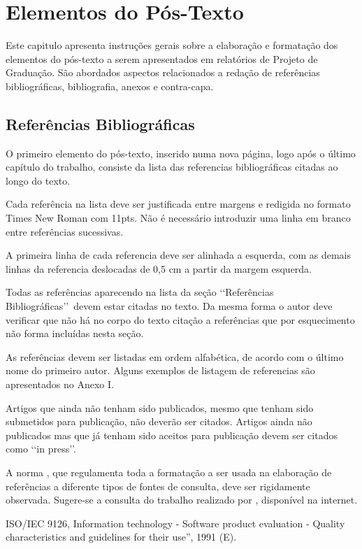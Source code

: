 \chapter[Elementos do Pós-Texto]{Elementos do Pós-Texto}

Este capitulo apresenta instruções gerais sobre a elaboração e formatação dos 
elementos do pós-texto a serem apresentados em relatórios de Projeto de 
Graduação. São abordados aspectos relacionados a redação de referências 
bibliográficas, bibliografia, anexos e contra-capa.

\section{Referências Bibliográficas}

O primeiro elemento do pós-texto, inserido numa nova página, logo após o último 
capítulo do trabalho, consiste da lista das referencias bibliográficas citadas 
ao longo do texto.

Cada referência na lista deve ser justificada entre margens e redigida no 
formato Times New Roman com 11pts. Não é necessário introduzir uma linha em 
branco entre referências sucessivas.

A primeira linha de cada referencia deve ser alinhada a esquerda, com as demais 
linhas da referencia deslocadas de 0,5 cm a partir da margem esquerda. 

Todas as referências aparecendo na lista da seção \lq\lq Referências 
Bibliográficas\rq\rq\ devem estar citadas no texto. Da mesma forma o autor deve 
verificar que não há no corpo do texto citação a referências que por 
esquecimento não forma incluídas nesta seção.

As referências devem ser listadas em ordem alfabética, de acordo com o último 
nome do primeiro autor. Alguns exemplos de listagem de referencias são 
apresentados no Anexo I.

Artigos que ainda não tenham sido publicados, mesmo que tenham sido submetidos 
para publicação, não deverão ser citados. Artigos ainda não publicados mas que 
já tenham sido aceitos para publicação devem ser citados como \lq\lq in 
press\rq\rq.

A norma \cite{NBR6034:2000}, que regulamenta toda a formatação a ser usada na 
elaboração de referências a diferente tipos de fontes de consulta, deve ser 
rigidamente observada. Sugere-se a consulta do trabalho realizado por 
\cite{arruda2007}, disponível na internet.

ISO/IEC 9126, Information technology - Software product evaluation - Quality
characteristics and guidelines for their use”, 1991 (E). 

